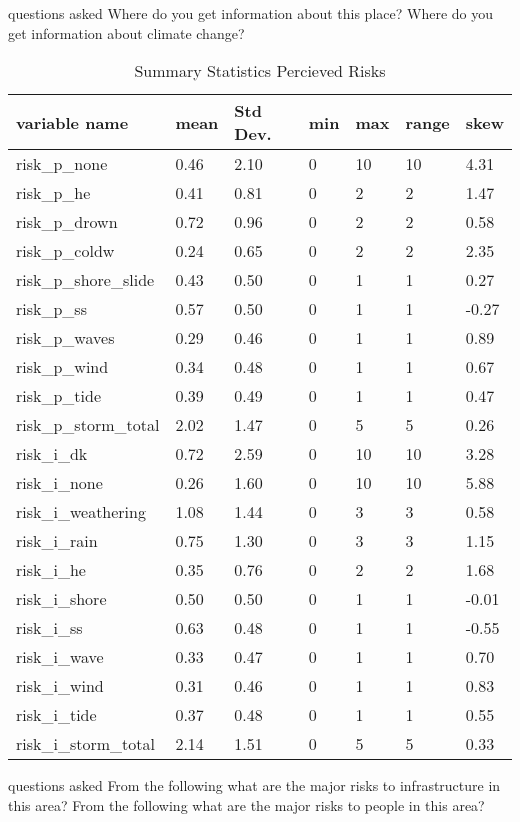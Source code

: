 \documentclass{article}
\begin{document}
questions asked Where do you get information about this place? Where do you get information about climate change?
\begin{center}
\begin{table}[!ht]
    \centering
    \begin{tabular}{|l|l|l|l|l|l|l|}
    \hline
        variable name & mean & Std Dev. & min & max & range & skew \\ \hline
        risk\_p\_none & 0.46 & 2.10 & 0 & 10 & 10 & 4.31\\ \hline
        risk\_p\_he & 0.41 & 0.81 & 0 & 2 & 2 & 1.47 \\ \hline
        risk\_p\_drown & 0.72 & 0.96 & 0 & 2 & 2 & 0.58  \\ \hline
        risk\_p\_coldw & 0.24 & 0.65 & 0 & 2 & 2 & 2.35  \\ \hline
        risk\_p\_shore\_slide & 0.43 & 0.50 & 0 & 1 & 1 & 0.27 \\ \hline
        risk\_p\_ss & 0.57 & 0.50 & 0 & 1 & 1 & -0.27  \\ \hline
        risk\_p\_waves & 0.29 & 0.46 & 0 & 1 & 1 & 0.89 \\ \hline
        risk\_p\_wind & 0.34 & 0.48 & 0 & 1 & 1 & 0.67  \\ \hline
        risk\_p\_tide & 0.39 & 0.49 & 0 & 1 & 1 & 0.47  \\ \hline
        risk\_p\_storm\_total & 2.02 & 1.47 & 0 & 5 & 5 & 0.26  \\ \hline
        risk\_i\_dk & 0.72 & 2.59 & 0 & 10 & 10 & 3.28  \\ \hline
        risk\_i\_none & 0.26 & 1.60 & 0 & 10 & 10 & 5.88 \\ \hline
        risk\_i\_weathering & 1.08 & 1.44 & 0 & 3 & 3 & 0.58  \\ \hline
        risk\_i\_rain & 0.75 & 1.30 & 0 & 3 & 3 & 1.15\\ \hline
        risk\_i\_he & 0.35 & 0.76 & 0 & 2 & 2 & 1.68 \\ \hline
        risk\_i\_shore & 0.50 & 0.50 & 0 & 1 & 1 & -0.01 \\ \hline
        risk\_i\_ss & 0.63 & 0.48 & 0 & 1 & 1 & -0.55  \\ \hline
        risk\_i\_wave & 0.33 & 0.47 & 0 & 1 & 1 & 0.70  \\ \hline
        risk\_i\_wind & 0.31 & 0.46 & 0 & 1 & 1 & 0.83 \\ \hline
        risk\_i\_tide & 0.37 & 0.48 & 0 & 1 & 1 & 0.55  \\ \hline
        risk\_i\_storm\_total & 2.14 & 1.51 & 0 & 5 & 5 & 0.33 \\ \hline
          \end{tabular}
    \caption{Summary Statistics Percieved Risks}
\label{table:summary_stats_percieved_risks}
\end{table}
\end{center}

questions asked From the following what are the major risks to infrastructure in this area?
From the following what are the major risks to people in this area?
\end{document}
